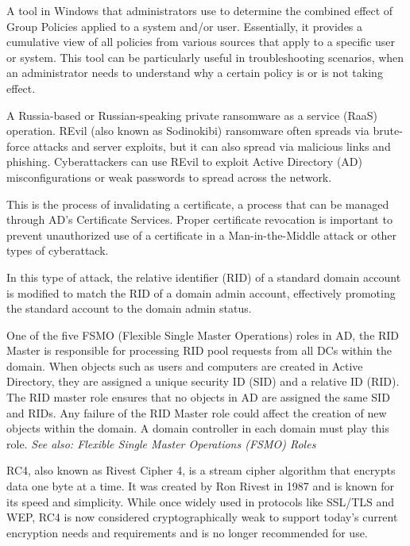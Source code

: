  A tool in Windows that administrators use to determine the combined effect of Group Policies applied to a system and/or user. Essentially, it provides a cumulative view of all policies from various sources that apply to a specific user or system. This tool can be particularly useful in troubleshooting scenarios, when an administrator needs to understand why a certain policy is or is not taking effect.

 A Russia-based or Russian-speaking private ransomware as a service (RaaS) operation. REvil (also known as Sodinokibi) ransomware often spreads via brute-force attacks and server exploits, but it can also spread via malicious links and phishing. Cyberattackers can use REvil to exploit Active Directory (AD) misconfigurations or weak passwords to spread across the network.

 This is the process of invalidating a certificate, a process that can be managed through AD’s Certificate Services. Proper certificate revocation is important to prevent unauthorized use of a certificate in a Man-in-the-Middle attack or other types of cyberattack.

 In this type of attack, the relative identifier (RID) of a standard domain account is modified to match the RID of a domain admin account, effectively promoting the standard account to the domain admin status.

 One of the five FSMO (Flexible Single Master Operations) roles in AD, the RID Master is responsible for processing RID pool requests from all DCs within the domain. When objects such as users and computers are created in Active Directory, they are assigned a unique security ID (SID) and a relative ID (RID). The RID master role ensures that no objects in AD are assigned the same SID and RIDs. Any failure of the RID Master role could affect the creation of new objects within the domain. A domain controller in each domain must play this role.
\textit{See also: Flexible Single Master Operations (FSMO) Roles}

 RC4, also known as Rivest Cipher 4, is a stream cipher algorithm that encrypts data one byte at a time. It was created by Ron Rivest in 1987 and is known for its speed and simplicity. While once widely used in protocols like SSL/TLS and WEP, RC4 is now considered cryptographically weak to support today's current encryption needs and requirements and is no longer recommended for use.

